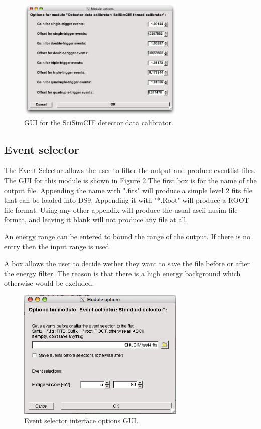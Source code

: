 \begin{figure}[tb]
 \begin{center}
  \includegraphics[width=8cm]{images/DetectorCalibratorSciSimCIEGUI.png}
  \caption{GUI for the SciSimCIE detector data calibrator.}
  \label{DCSciSimCIEGUI}
 \end{center}
\end{figure}

\subsection{Event selector}
The Event Selector allows the user to filter the output and produce eventlist files. The GUI for this module is shown in Figure \ref{eventgui} The first box is for the name of the output file. Appending the name with ".fits" will produce a simple level 2 fits file that can be loaded into DS9. Appending it with "*.Root" will produce a ROOT file format. Using any other appendix will produce the usual ascii nusim file format, and leaving it blank will not produce any file at all.

An energy range can be entered to bound the range of the output. If there is no entry then the input range is used.

A box allows the user to decide wether they want to save the file before or after the energy filter. The reason is that there is a high energy background which otherwise would be excluded.

\begin{figure}[tb]
\begin{center}
\includegraphics[width=8cm]{images/eventselectorGUI.png}  
\caption{Event selector interface options GUI.}
\label{eventgui} 
\end{center}
\end{figure}

